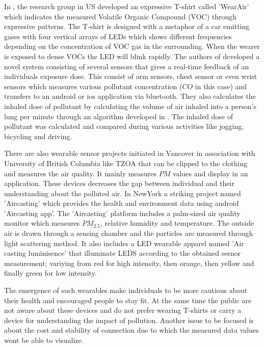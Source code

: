 In \cite{Kim2010}, the research group in US developed an expressive T-shirt called 'WearAir' which indicates the measured Volatile Organic Compound (VOC) through expressive patterns. The T-shirt is designed with a metaphor of a car emitting gases with four vertical arrays of LEDs which shows different frequencies depending on the concentration of VOC gas in the surrounding. When the wearer is exposed to dense VOCs the LED will blink rapidly. 
The authors of \cite{Hu2014} developed a novel system consisting of several sensors that gives a real-time feedback of an individuals exposure dose. This consist of arm sensors, chest sensor or even wrist sensors which measures various pollutant concentration ($CO$ in this case) and transfers to an android or ios application via bluetooth. They also calculates the inhaled dose of pollutant by calculating the volume of air inhaled into a person's lung per minute through an algorithm developed in \cite{Valli2013}. The inhaled dose of pollutant was calculated and compared  during various activities like jogging, bicycling and driving.

 There are also wearable sensor projects initiated in Vancover in association with University of British Columbia like TZOA \cite{tzoa} that can be clipped to the clothing and measures the air quality. It mainly measures $PM$ values and display in an application. These devices decreases the gap between individual and their understanding about the polluted air. In NewYork a striking project named 'Aircasting'\cite{aircasting} which provides the health and environment data using android 'Aircasting app'. The 'Aircasting'\cite{Han2010} platform includes a palm-sized air quality monitor which measures $PM_{2.5}$, relative humidity and temperature. The outside air is drawn through a sensing chamber and the particles are measured through light scattering method. It also includes a LED wearable apparel named 'Air casting luminisence'\cite{Luminescence} that illuminate LEDS according to the obtained sesnor measurement; variying from red for high intensity, then orange, then yellow and finally green for low intensity. 
 
 The emergence of such wearables make individuals to be more cautious about their health and encouraged people to stay fit. At the same time the public are not aware about these devices and do not prefer wearing T-shirts or carry a device for understanding the impact of pollution. Another issue to be focused is about the cost and stability of  connection due to which the measured data values wont be able to visualize.




